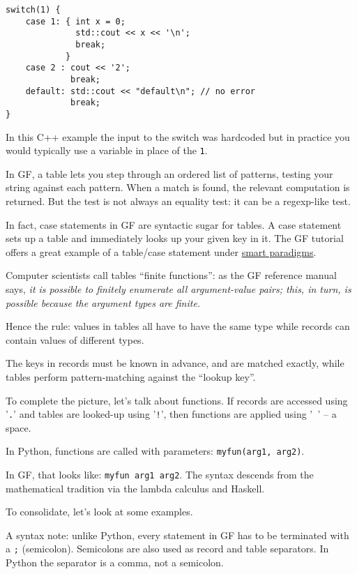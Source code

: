 \documentclass{scrartcl}
\begin{document}
\begin{verbatim}
switch(1) {
    case 1: { int x = 0;
              std::cout << x << '\n';
              break;
            }
    case 2 : cout << '2';
             break;
    default: std::cout << "default\n"; // no error
             break;
}
\end{verbatim}

In this C++ example the input to the switch was hardcoded but in practice you would typically use a variable in place of the \texttt{1}.

In GF, a table lets you step through an ordered list of patterns, testing your string against each pattern. When a match is found, the relevant computation is returned. But the test is not always an equality test: it can be a regexp-like test.

In fact, case statements in GF are syntactic sugar for tables. A case statement sets up a table and immediately looks up your given key in it. The GF tutorial offers a great example of a table/case statement under \href{http://www.grammaticalframework.org/doc/tutorial/gf-tutorial.html#toc59}{smart paradigms}.

Computer scientists call tables ``finite functions'': as the GF reference manual says, \textit{it is possible to finitely enumerate all argument-value pairs; this, in turn, is possible because the argument types are finite.}

Hence the rule: values in tables all have to have the same type while records can contain values of different types.

The keys in records must be known in advance, and are matched exactly, while tables perform pattern-matching against the ``lookup key''.

To complete the picture, let's talk about functions. If records are accessed using '\texttt{.}' and tables are looked-up using '\texttt{!}', then functions are applied using '\texttt{ }' -- a space.

In Python, functions are called with parameters: \texttt{myfun(arg1, arg2)}.

In GF, that looks like: \texttt{myfun arg1 arg2}. The syntax descends from the mathematical tradition via the lambda calculus and Haskell.

To consolidate, let's look at some examples.



A syntax note: unlike Python, every statement in GF has to be terminated with a \texttt{;} (semicolon). Semicolons are also used as record and table separators. In Python the separator is a comma, not a semicolon.
\end{document}
